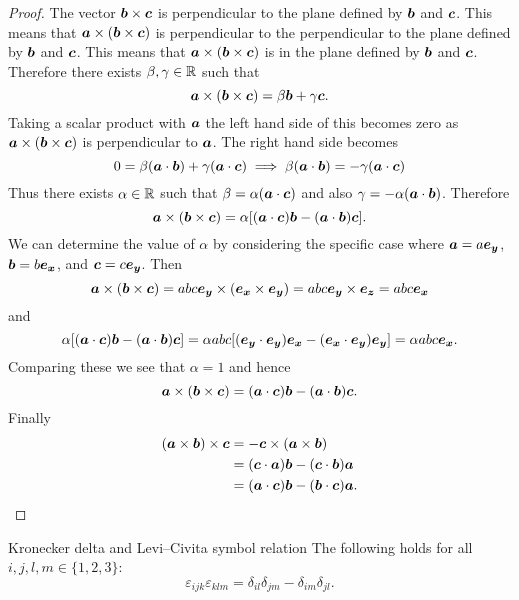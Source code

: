 \documentclass[a4paper]{article}
\begin{document}
    \begin{proof}
        The vector \(\bm{b}\times\bm{c}\) is perpendicular to the plane defined by \(\bm{b}\) and \(\bm{c}\).
        This means that \(\bm{a}\times(\bm{b}\times\bm{c})\) is perpendicular to the perpendicular to the plane defined by \(\bm{b}\) and \(\bm{c}\).
        This means that \(\bm{a}\times(\bm{b}\times\bm{c})\) is in the plane defined by \(\bm{b}\) and \(\bm{c}\).
        Therefore there exists \(\beta, \gamma\in\mathbb{R}\) such that
        \[\bm{a}\times(\bm{b}\times\bm{c}) = \beta\bm{b} + \gamma\bm{c}.\]
        Taking a scalar product with \(\bm{a}\) the left hand side of this becomes zero as \(\bm{a}\times(\bm{b}\times\bm{c})\) is perpendicular to \(\bm{a}\).
        The right hand side becomes
        \[0 = \beta(\bm{a}\cdot\bm{b}) + \gamma(\bm{a}\cdot\bm{c}) \implies \beta(\bm{a}\cdot\bm{b}) = -\gamma(\bm{a}\cdot\bm{c})\]
        Thus there exists \(\alpha\in\mathbb{R}\) such that \(\beta = \alpha(\bm{a}\cdot\bm{c})\) and also \(\gamma = -\alpha(\bm{a}\cdot\bm{b})\).
        Therefore
        \[\bm{a}\times(\bm{b}\times\bm{c}) = \alpha[(\bm{a}\cdot\bm{c})\bm{b} - (\bm{a}\cdot\bm{b})\bm{c}].\]
        We can determine the value of \(\alpha\) by considering the specific case where \(\bm{a} = a\bm{e_{y}}\), \(\bm{b} = b\bm{e_{x}}\), and \(\bm{c} = c\bm{e_{y}}\).
        Then
        \[\bm{a}\times(\bm{b}\times\bm{c}) = abc\bm{e_{y}}\times(\bm{e_{x}}\times\bm{e_{y}}) = abc\bm{e_{y}}\times\bm{e_{z}} = abc\bm{e_{x}}\]
        and
        \[\alpha[(\bm{a}\cdot\bm{c})\bm{b} - (\bm{a}\cdot\bm{b})\bm{c}] = \alpha abc[(\bm{e_{y}}\cdot\bm{e_{y}})\bm{e_{x}} - (\bm{e_{x}}\cdot\bm{e_{y}})\bm{e_{y}}] = \alpha abc\bm{e_{x}}.\]
        Comparing these we see that \(\alpha = 1\) and hence
        \[\bm{a}\times(\bm{b}\times\bm{c}) = (\bm{a}\cdot\bm{c})\bm{b} - (\bm{a}\cdot\bm{b})\bm{c}.\]
        Finally
        \begin{align*}
            (\bm{a}\times\bm{b})\times\bm{c} &= -\bm{c}\times(\bm{a}\times\bm{b})\\
            &= (\bm{c}\cdot\bm{a})\bm{b} - (\bm{c}\cdot\bm{b})\bm{a}\\
            &= (\bm{a}\cdot\bm{c})\bm{b} - (\bm{b}\cdot\bm{c})\bm{a}.
        \end{align*}
    \end{proof}
    \begin{corollary}{Kronecker delta and Levi--Civita symbol relation}{}
        The following holds for all \(i, j, l, m \in \{1, 2, 3\}\):
        \[\varepsilon_{ijk}\varepsilon_{klm} = \delta_{il}\delta_{jm} - \delta_{im}\delta_{jl}.\]
    \end{corollary}
\end{document}
